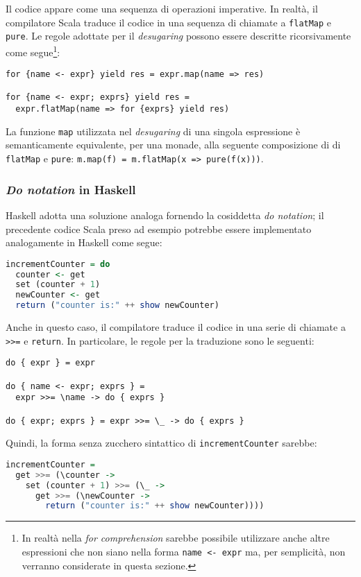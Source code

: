 Il codice appare come una sequenza di operazioni imperative. In realtà, il compilatore Scala traduce il codice in una sequenza di chiamate a \lstinline{flatMap} e \lstinline{pure}.
Le regole adottate per il \emph{desugaring} possono essere descritte ricorsivamente come segue\footnote{In realtà nella \emph{for comprehension} sarebbe possibile utilizzare anche altre espressioni che non siano nella forma \lstinline{name <- expr} ma, per semplicità, non verranno considerate in questa sezione.}:

\begin{lstlisting}
for {name <- expr} yield res = expr.map(name => res)

for {name <- expr; exprs} yield res =
  expr.flatMap(name => for {exprs} yield res)
\end{lstlisting}

La funzione \lstinline{map} utilizzata nel \emph{desugaring} di una singola espressione è semanticamente equivalente, per una monade, alla seguente composizione di di \lstinline{flatMap} e \lstinline{pure}: \lstinline{m.map(f) = m.flatMap(x => pure(f(x)))}.

\subsubsection{\emph{Do notation} in Haskell}
Haskell adotta una soluzione analoga fornendo la cosiddetta \emph{do notation}; il precedente codice Scala preso ad esempio potrebbe essere implementato analogamente in Haskell come segue:
\begin{lstlisting}[language=haskell]
incrementCounter = do
  counter <- get
  set (counter + 1)
  newCounter <- get
  return ("counter is:" ++ show newCounter)
\end{lstlisting}
Anche in questo caso, il compilatore traduce il codice in una serie di chiamate a \lstinline{>>=} e \lstinline{return}. In particolare, le regole per la traduzione sono le seguenti:
\begin{lstlisting}
do { expr } = expr

do { name <- expr; exprs } =
  expr >>= \name -> do { exprs }

do { expr; exprs } = expr >>= \_ -> do { exprs }
\end{lstlisting}

Quindi, la forma senza zucchero sintattico di \lstinline{incrementCounter} sarebbe:
\begin{lstlisting}[language=haskell]
incrementCounter =
  get >>= (\counter ->
    set (counter + 1) >>= (\_ ->
      get >>= (\newCounter ->
        return ("counter is:" ++ show newCounter))))
\end{lstlisting}

